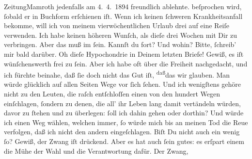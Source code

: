 \begin{ledgroupsized}[t]{13cm}
{{{{                     Zeitung}Mamroth jedenfalls am 4. 4. 1894 freundlich ablehnte.}}}\label{K_L02621-9h}
               beſprochen wird, ſobald er in Buchform erſchienen iſt.\pend
           \pstart
           Wenn ich keinen ſchweren Krankheitsanfall bekomme, will ich von meinem
               vierwöchentlichen Urlaub drei auf eine Reiſe verwenden. Ich habe keinen höheren
               Wunſch, als dieſe drei Wochen mit Dir zu verbringen. Aber das muß im \label{K_L02621-10v}\label{K_L02621-10h} ſein.
               Kannſt du fort? Und wohin? Bitte, ſchreib’ mir bald darüber.\pend
           \pstart
           {\pb}Oh dieſe Hypochondrie in Deinem letzten Briefe!
               Gewiß, es iſt wünſchenswerth frei zu ſein. Aber ich habe oft über die Freiheit
               nachgedacht, und ich fürchte beinahe, daß ſie doch nicht das Gut iſt, \substVorne{}\textsuperscript{daß}\substDazwischen{}das\substHinten{} wir glauben. Man würde glücklich auf allen Seiten Wege vor ſich ſehen. Und
               ich wenigſtens gehöre nicht zu den Leuten, die raſch entſchloſſen einen von den
               hundert Wegen einſchlagen, ſondern zu denen, die all’ ihr Leben lang damit vertändeln
               würden, davor zu ſtehen {\pb}und zu überlegen: ſoll ich
               dahin gehen oder dorthin? Und würde ich einen Weg wählen, welchen immer, ſo würde
               mich bis an meinen Tod die Reue verfolgen, daß ich nicht den andern eingeſchlagen.
               Biſt Du nicht auch ein wenig ſo? Gewiß, der Zwang iſt drückend. Aber es hat auch ſein
               gutes: es erſpart einem die Mühe der Wahl und die Verantwortung dafür. Der Zwang,
                  \label{K_L02621-11v}
\end{ledgroupsized}
